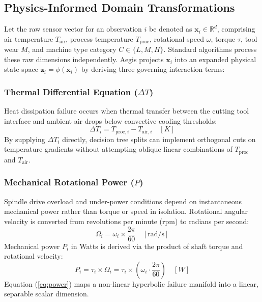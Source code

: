 \documentclass[conference]{IEEEtran}
\begin{document}
\subsection{Physics-Informed Domain Transformations}
Let the raw sensor vector for an observation $i$ be denoted as $\mathbf{x}_i \in \mathbb{R}^d$, comprising air temperature $T_{\text{air}}$, process temperature $T_{\text{proc}}$, rotational speed $\omega$, torque $\tau$, tool wear $M$, and machine type category $C \in \{L, M, H\}$. Standard algorithms process these raw dimensions independently. Aegis projects $\mathbf{x}_i$ into an expanded physical state space $\mathbf{z}_i = \phi(\mathbf{x}_i)$ by deriving three governing interaction terms:

\subsubsection{Thermal Differential Equation ($\Delta T$)}
Heat dissipation failure occurs when thermal transfer between the cutting tool interface and ambient air drops below convective cooling thresholds:
\begin{equation}
\Delta T_i = T_{\text{proc}, i} - T_{\text{air}, i} \quad [K]
\label{eq:delta_t}
\end{equation}
By supplying $\Delta T_i$ directly, decision tree splits can implement orthogonal cuts on temperature gradients without attempting oblique linear combinations of $T_{\text{proc}}$ and $T_{\text{air}}$.

\subsubsection{Mechanical Rotational Power ($P$)}
Spindle drive overload and under-power conditions depend on instantaneous mechanical power rather than torque or speed in isolation. Rotational angular velocity is converted from revolutions per minute (rpm) to radians per second:
\begin{equation}
\Omega_i = \omega_i \times \frac{2\pi}{60} \quad [\text{rad/s}]
\end{equation}
Mechanical power $P_i$ in Watts is derived via the product of shaft torque and rotational velocity:
\begin{equation}
P_i = \tau_i \times \Omega_i = \tau_i \times \left(\omega_i \cdot \frac{2\pi}{60}\right) \quad [W]
\label{eq:power}
\end{equation}
Equation (\ref{eq:power}) maps a non-linear hyperbolic failure manifold into a linear, separable scalar dimension.
\end{document}

